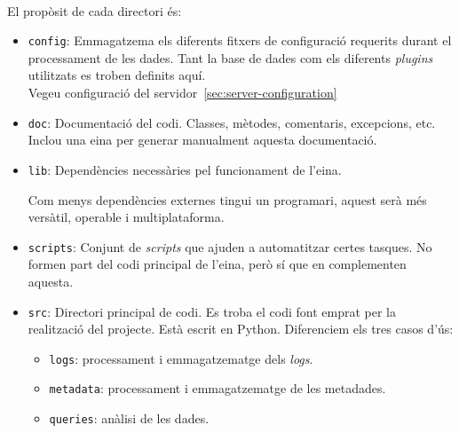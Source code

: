 \noindent \\
El propòsit de cada directori és:

\begin{itemize}
    \item \texttt{config}: Emmagatzema els diferents fitxers de configuració requerits durant el processament de les dades.
    Tant la base de dades com els diferents \textit{\gls{plugin}s} utilitzats es troben definits aquí. \\
    Vegeu configuració del servidor~\ref{sec:server-configuration}
    \item \texttt{doc}: Documentació del codi.
    Classes, mètodes, comentaris, excepcions, etc.
    Inclou una eina per generar manualment aquesta documentació.
    \item \texttt{lib}: Dependències necessàries pel funcionament de l'eina.
    \begin{tcolorbox}[colback=blue!5!white, colframe=blue!75!black, title=Interoperabilitat]
        Com menys dependències externes tingui un programari, aquest serà més versàtil, operable i multiplataforma.
    \end{tcolorbox}
    \item \texttt{scripts}: Conjunt de \textit{scripts} que ajuden a automatitzar certes tasques.
    No formen part del codi principal de l'eina, però sí que en complementen aquesta.
    \item \texttt{src}: Directori principal de codi.
    Es troba el codi font emprat per la realització del projecte.
    Està escrit en Python.
    Diferenciem els tres casos d'ús:
    \begin{itemize}
        \item \texttt{logs}: processament i emmagatzematge dels \textit{logs}.
        \item \texttt{metadata}: processament i emmagatzematge de les metadades.
        \item \texttt{queries}: anàlisi de les dades.
    \end{itemize}
\end{itemize}

